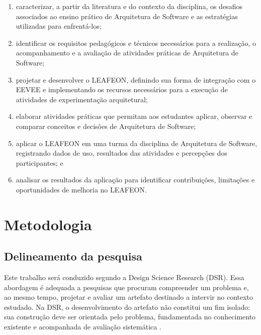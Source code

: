 \begin{enumerate}
    \item caracterizar, a partir da literatura e do contexto da disciplina, os
    desafios associados ao ensino prático de Arquitetura de Software e as
    estratégias utilizadas para enfrentá-los;

    \item identificar os requisitos pedagógicos e técnicos necessários para a
    realização, o acompanhamento e a avaliação de atividades práticas de
    Arquitetura de Software;

    \item projetar e desenvolver o LEAFEON, definindo sua forma de integração
    com o EEVEE e implementando os recursos necessários para a execução de
    atividades de experimentação arquitetural;

    \item elaborar atividades práticas que permitam aos estudantes aplicar,
    observar e comparar conceitos e decisões de Arquitetura de Software;

    \item aplicar o LEAFEON em uma turma da disciplina de Arquitetura de
    Software, registrando dados de uso, resultados das atividades e percepções
    dos participantes; e

    \item analisar os resultados da aplicação para identificar contribuições,
    limitações e oportunidades de melhoria no LEAFEON.
\end{enumerate}

\section{Metodologia}
\label{sec:metodologia}

\subsection{Delineamento da pesquisa}

Este trabalho será conduzido segundo a Design Science Research (DSR). Essa
abordagem é adequada a pesquisas que procuram compreender um problema e, ao
mesmo tempo, projetar e avaliar um artefato destinado a intervir no contexto
estudado. Na DSR, o desenvolvimento do artefato não constitui um fim isolado:
sua construção deve ser orientada pelo problema, fundamentada no conhecimento
existente e acompanhada de avaliação sistemática
\cite{hevner_design_2004,dresch_design_2015}.


